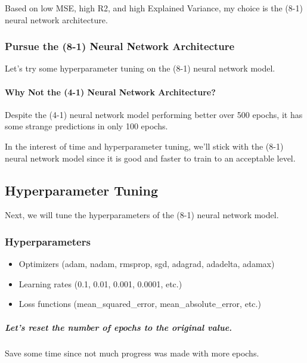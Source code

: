 \documentclass[11pt]{article}
\providecommand{\tightlist}{%
      \setlength{\itemsep}{0pt}\setlength{\parskip}{0pt}}
\begin{document}
Based on low MSE, high R2, and high Explained Variance, my choice is the
(8-1) neural network architecture.

\subsubsection{Pursue the (8-1) Neural Network
Architecture}\label{pursue-the-8-1-neural-network-architecture}

Let's try some hyperparameter tuning on the (8-1) neural network model.

\paragraph{Why Not the (4-1) Neural Network
Architecture?}\label{why-not-the-4-1-neural-network-architecture}

Despite the (4-1) neural network model performing better over 500
epochs, it has some strange predictions in only 100 epochs.

In the interest of time and hyperparameter tuning, we'll stick with the
(8-1) neural network model since it is good and faster to train to an
acceptable level.

    \subsection{Hyperparameter Tuning}\label{hyperparameter-tuning}

Next, we will tune the hyperparameters of the (8-1) neural network
model.

\subsubsection{Hyperparameters}\label{hyperparameters}

\begin{itemize}
\tightlist
\item
  Optimizers (adam, nadam, rmsprop, sgd, adagrad, adadelta, adamax)
\item
  Learning rates (0.1, 0.01, 0.001, 0.0001, etc.)
\item
  Loss functions (mean\_squared\_error, mean\_absolute\_error, etc.)
\end{itemize}

\subparagraph{Let's reset the number of epochs to the original
value.}\label{lets-reset-the-number-of-epochs-to-the-original-value.}

Save some time since not much progress was made with more epochs.
\end{document}
